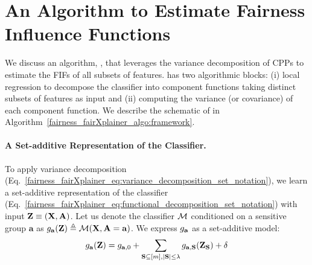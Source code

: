 \section{ An Algorithm to Estimate Fairness Influence Functions}\label{fairness_fairXplainer_sec:fairxplainer}
\begin{comment}
Represent the algorithm as a sequence of two blocks: (1) Component function learning (2) Covariance computation of component functions. 
\end{comment}
We discuss an algorithm, {\fairXplainer}, that leverages the variance decomposition of CPPs to estimate the FIFs of all subsets of features. {\fairXplainer} has two algorithmic blocks: (i) local regression to decompose the classifier into component functions taking distinct subsets of features as input and (ii) computing the variance (or covariance) of each component function. We describe the schematic of {\fairXplainer} in Algorithm~\ref{fairness_fairXplainer_algo:framework}.
\setlength{\textfloatsep}{12pt}%

\paragraph{A Set-additive Representation of the Classifier.} To apply variance decomposition (Eq.~\eqref{fairness_fairXplainer_eq:variance_decomposition_set_notation}), we learn a set-additive representation of the classifier (Eq.~\eqref{fairness_fairXplainer_eq:functional_decomposition_set_notation}) with input $ \mathbf{Z} \equiv (\mathbf{X}, \mathbf{A}) $. Let us denote the classifier $ \mathcal{M} $ conditioned on a sensitive group $ \mathbf{a} $ as $ g_{\mathbf{a}}(\mathbf{Z}) \triangleq \mathcal{M}(\mathbf{X}, \mathbf{A} = \mathbf{a}) $. We express $ g_{\mathbf{a}} $ as a set-additive model:
\begin{align}
\label{fairness_fairXplainer_eq:set_additive_classifier}
g_{\mathbf{a}}(\mathbf{Z}) = g_{\mathbf{a}, 0} +  \sum_{\mathbf{S} \subseteq [m] , |\mathbf{S}| \le \lambda} g_{\mathbf{a},\mathbf{S}}(\mathbf{Z}_{\mathbf{S}}) + \delta
\end{align}

